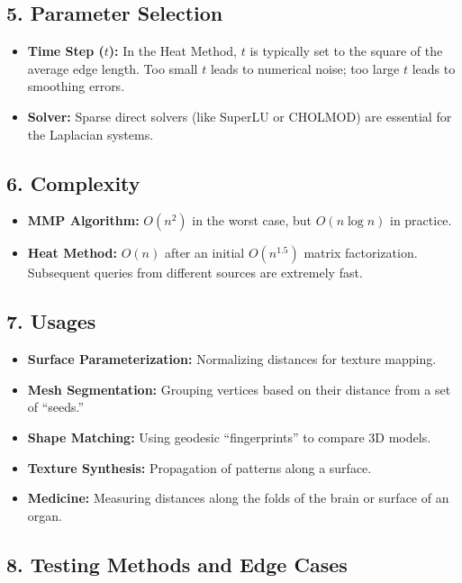 \subsection{5. Parameter Selection}

\begin{itemize}
    \item \textbf{Time Step ($t$):} In the Heat Method, $t$ is typically set to the square of the average edge length. Too small $t$ leads to numerical noise; too large $t$ leads to smoothing errors.
    \item \textbf{Solver:} Sparse direct solvers (like SuperLU or CHOLMOD) are essential for the Laplacian systems.
\end{itemize}

\subsection{6. Complexity}

\begin{itemize}
    \item \textbf{MMP Algorithm:} $O(n^2)$ in the worst case, but $O(n \log n)$ in practice.
    \item \textbf{Heat Method:} $O(n)$ after an initial $O(n^{1.5})$ matrix factorization. Subsequent queries from different sources are extremely fast.
\end{itemize}

\subsection{7. Usages}

\begin{itemize}
    \item \textbf{Surface Parameterization:} Normalizing distances for texture mapping.
    \item \textbf{Mesh Segmentation:} Grouping vertices based on their distance from a set of ``seeds.''
    \item \textbf{Shape Matching:} Using geodesic ``fingerprints'' to compare 3D models.
    \item \textbf{Texture Synthesis:} Propagation of patterns along a surface.
    \item \textbf{Medicine:} Measuring distances along the folds of the brain or surface of an organ.
\end{itemize}

\subsection{8. Testing Methods and Edge Cases}

